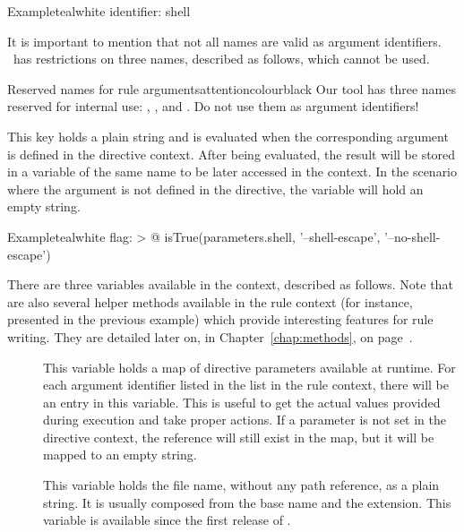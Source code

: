 \begin{description}
\begin{description}
\begin{codebox}{Example}{teal}{\icnote}{white}
identifier: shell
\end{codebox}

It is important to mention that not all names are valid as argument identifiers. \arara\ has restrictions on three names, described as follows, which cannot be used.

\begin{messagebox}{Reserved names for rule arguments}{attentioncolour}{\icattention}{black}
Our tool has three names reserved for internal use: , , and . Do not use them as argument identifiers!
\end{messagebox}

\item[\describecontext{O}{arguments}{flag}] This key holds a plain string and is evaluated when the corresponding argument is defined in the directive context.  After being evaluated, the result will be stored in a variable of the same name to be later accessed in the  context. In the scenario where the argument is not defined in the directive, the variable will hold an empty string.

\begin{codebox}{Example}{teal}{\icnote}{white}
flag: >
  @{
      isTrue(parameters.shell, '--shell-escape',
             '--no-shell-escape')
  }
\end{codebox}

There are three variables available in the  context, described as follows. Note that are also several helper methods available in the rule context (for instance,  presented in the previous example) which provide interesting features for rule writing. They are detailed later on, in Chapter~\ref{chap:methods}, on page~\pageref{chap:methods}.

\begin{description}
\item[] This variable holds a map of directive parameters available at runtime. For each argument identifier listed in the  list in the rule context, there will be an entry in this variable. This is useful to get the actual values provided during execution and take proper actions. If a parameter is not set in the directive context, the reference will still exist in the map, but it will be mapped to an empty string.

\item[] This variable holds the file name, without any path reference, as a plain string. It is usually composed from the base name and the extension. This variable is available since the first release of \arara.


\end{description}
\end{description}
\end{description}

